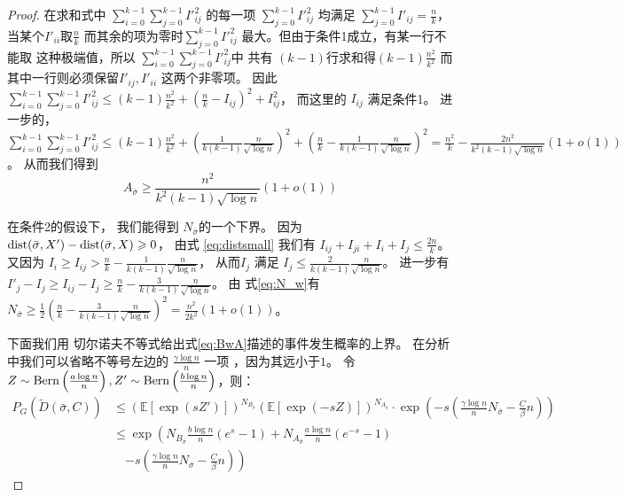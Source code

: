 \begin{proof}
    在求和式中 $\sum_{i=0}^{k-1} \sum_{j=0}^{k-1} I'^2_{ij}$
    的每一项 $\sum_{j=0}^{k-1} I'^2_{ij}$
    均满足 $\sum_{j=0}^{k-1}
    I'_{ij} = \frac{n}{k}$，当某个$I'_{ii}$取$\frac{n}{k}$
    而其余的项为零时$\sum_{j=0}^{k-1} I'^2_{ij}$
    最大。但由于条件1成立，有某一行不能取
    这种极端值，所以 $\sum_{i=0}^{k-1} \sum_{j=0}^{k-1} I'^2_{ij}$中
    共有 $(k-1)$行求和得$ (k-1)\frac{n^2}{k^2}$
    而其中一行则必须保留$I'_{ij}, I'_{ii}$ 这两个非零项。
    因此 $\sum_{i=0}^{k-1} \sum_{j=0}^{k-1} I'^2_{ij}
    \leq (k-1)\frac{n^2}{k^2} + (\frac{n}{k} - I_{ij})^2 + I^2_{ij}$，
    而这里的
    $I_{ij}$ 满足条件1。
    进一步的， $\sum_{i=0}^{k-1} \sum_{j=0}^{k-1} I'^2_{ij} \leq (k-1)\frac{n^2}{k^2} + (\frac{1}{k(k-1)}\frac{n}{\sqrt{\log n}})^2
    + (\frac{n}{k} - \frac{1}{k(k-1)}\frac{n}{\sqrt{\log n}})^2 = \frac{n^2}{k} - \frac{2n^2}{k^2 (k-1)\sqrt{\log n}}(1+o(1))$。
    从而我们得到
  \begin{equation}\label{eq:Asigma}
    A_{\bar{\sigma}} \geq \frac{n^2}{k^2 (k-1)\sqrt{\log n}}(1+o(1))
    \end{equation}
    
    
    在条件2的假设下， 我们能得到
    $N_{\bar{\sigma}}$的一个下界。
    因为
    $\operatorname{dist}(\bar{\sigma}, X') - \operatorname{dist}(\bar{\sigma}, X) \geqslant 0$，
     由式 \eqref{eq:distsmall}  我们有
    $I_{ij} + I_{ji} + I_{i} + I_j \leq \frac{2n}{k} $。
    又因为 $I_i \geq I_{ij} > \frac{n}{k} - \frac{1}{k(k-1)}\frac{n}{\sqrt{\log n}}$，
    从而$I_j $ 满足
    $I_j \leq \frac{2}{k(k-1)}\frac{n}{\sqrt{\log n} }$。
    进一步有 $I'_j - I_j \geq I_{ij} - I_j \geq  \frac{n}{k} - \frac{3}{k(k-1)}\frac{n}{\sqrt{\log n} }$。
    由 式\eqref{eq:N_w}有
     $N_{\bar{\sigma}} \geq \frac{1}{2}(\frac{n}{k} - \frac{3}{k(k-1)}\frac{n}{\sqrt{\log n}})^2 = \frac{n^2}{2k^2}(1+o(1))$。
    
    下面我们用
     切尔诺夫不等式给出式\eqref{eq:BwA}描述的事件发生概率的上界。
     在分析中我们可以省略不等号左边的 $\frac{\gamma \log n}{n}$ 一项
     ，因为其远小于$1$。
    令 $Z \sim \operatorname{Bern}\left(\frac{a \log n}{n}\right), Z' \sim \operatorname{Bern}\left(\frac{b \log n}{n}\right)$，则：
    \begin{align*}
    P_G(\widetilde{D}(\bar{\sigma}, C))
    &\leq (\mathbb{E}[\exp(sZ')])^{N_{B_{\bar{\sigma}}}}
    (\mathbb{E}[\exp(-sZ)])^{N_{A_{\bar{\sigma}}}}\cdot 
    \exp(-s(\frac{\gamma \log n}{n} N_{\bar{\sigma}}  - \frac{C}{\beta}n)) \\
    & \leq \exp\left(N_{B_{\bar{\sigma}}}
    \frac{b\log n}{n}(e^s -1) + 
    N_{A_{\bar{\sigma}}}\frac{a\log n}{n} \left(e^{-s} - 1 \right)\right. \\
    &\quad \left. - s \left(\frac{\gamma \log n}{n} N_{\bar{\sigma}} 
    - \frac{C}{\beta}n \right)
    \right) 
    \end{align*}
    

\end{proof}
